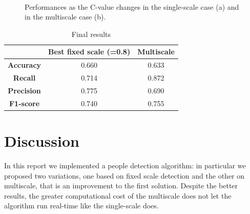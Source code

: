 \documentclass[a4paper, 10pt, onecolumn]{article} %
\begin{document}
\begin{figure}[h!]
\centering
{}\\
\caption{Performances as the C-value changes in the single-scale case (a) and in the multiscale case (b).}
\label{fig:cvalue}
\end{figure}


\begin{table}[h!]
\centering
\begin{tabular}{c||c|c}
&\textbf{Best fixed scale (=0.8)} & \textbf{Multiscale}\\
\hline \hline 
\textbf{Accuracy} &0.660 & 0.633\\
\textbf{Recall} &0.714  & 0.872\\
\textbf{Precision} & 0.775 & 0.690\\
\textbf{F1-score} & 0.740& 0.755\\
\end{tabular}
\caption{Final results}
\label{tab:res}
\end{table}

\section{Discussion}\label{discussion}
In this report we implemented a people detection algorithm: in particular we proposed two variations, one based on fixed scale detection and the other on multiscale, that is an improvement to the first solution. Despite the better results, the greater computational cost of the multiscale does not let the algorithm run real-time like the single-scale does.
\end{document}
